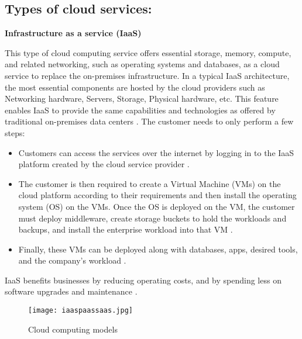 \subsection{Types of cloud services:}
\textbf{Infrastructure as a service (IaaS)}
\par This type of cloud computing service offers
essential storage, memory, compute, and related networking, such as
operating systems and databases, as a cloud service to replace the on-premises infrastructure.
In a typical IaaS
architecture, the most essential components are hosted by the cloud providers such as Networking hardware, Servers, Storage, Physical hardware, etc.
This feature enables IaaS to provide the same capabilities and technologies as offered by traditional on-premises data centers \cite{9}.
The customer needs to only perform a few steps:
\begin{itemize}
    \item Customers can access the services over the internet by logging in to the IaaS platform created by the cloud
    service provider \cite{15}.
\end{itemize}
\begin{itemize}
    \item The customer is then required to create a Virtual
    Machine (VMs) on the cloud platform according to their
    requirements and then install the operating system
    (OS) on the VMs. Once the OS is deployed on the VM,
    the customer must deploy middleware, create
    storage buckets to hold the workloads and backups, and
    install the enterprise workload into that VM \cite{15}.
\end{itemize}
\begin{itemize}
    \item Finally, these VMs can be deployed along with databases, apps, desired tools, and the company’s workload \cite{15}.
\end{itemize}
IaaS benefits businesses by reducing operating costs, and by spending less on software upgrades and maintenance
\cite{15}.

\begin{figure}
    \centering
    \texttt{[image: iaaspaassaas.jpg]}
    \caption{Cloud computing models}{\cite{16}}
    \label{fig:iaaspaassaas}
\end{figure}

